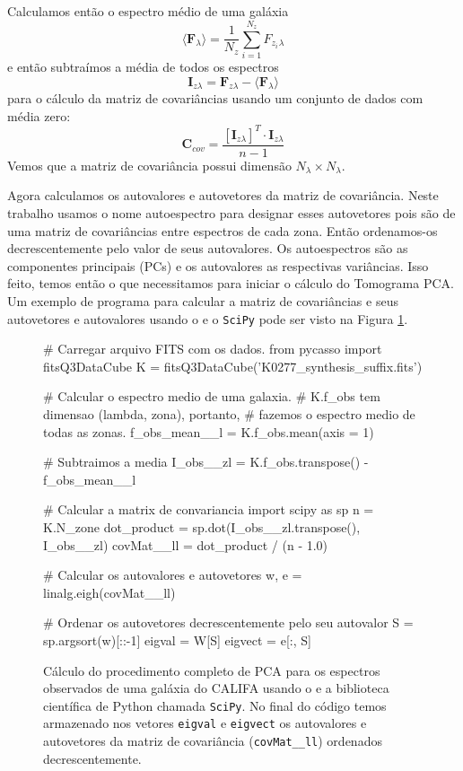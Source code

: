 Calculamos então o espectro médio de uma galáxia
\begin{equation}
\langle \textbf{F}{}_\lambda \rangle = \frac{1}{N_z} \sum_{i=1}^{N_z} F_{z_i}{}_{\lambda}
\end{equation}
\noindent e então subtraímos a média de todos os espectros
\begin{equation}
	\label{eq:PCA:Izl}
	\textbf{I}{}_{z \lambda} = \textbf{F}{}_{z \lambda} - \langle \textbf{F}{}_\lambda \rangle
\end{equation}
\noindent para o cálculo da matriz de covariâncias usando um conjunto de dados com média zero:
\begin{equation}
	\label{eq:PCA:covMatrix}
	\mathbf{C}{}_{cov} = \frac{[\mathbf{I}{}_{z \lambda}]^T \cdot \mathbf{I}{}_{z \lambda}}{n - 1}
\end{equation}
\noindent Vemos que a matriz de covariância possui dimensão $N_\lambda \times N_\lambda$.

Agora calculamos os autovalores e autovetores da matriz de covariância. Neste trabalho usamos o nome autoespectro para
designar esses autovetores pois são de uma matriz de covariâncias entre espectros de cada zona. Então ordenamos-os
decrescentemente pelo valor de seus autovalores. Os autoespectros são as componentes principais (PCs) e os autovalores
as respectivas variâncias. Isso feito, temos então o que necessitamos para iniciar o cálculo do Tomograma PCA. Um
exemplo de programa para calcular a matriz de covariâncias e seus autovetores e autovalores usando o \pycasso e o
\texttt{SciPy} pode ser visto na Figura \ref{fig:programaCovMatrix}.

\begin{figure}
	\begin{python}
# Carregar arquivo FITS com os dados.
from pycasso import fitsQ3DataCube
K = fitsQ3DataCube('K0277_synthesis_suffix.fits')

# Calcular o espectro medio de uma galaxia. 
# K.f_obs tem dimensao (lambda, zona), portanto, 
# fazemos o espectro medio de todas as zonas.
f_obs_mean__l = K.f_obs.mean(axis = 1)

# Subtraimos a media
I_obs__zl = K.f_obs.transpose() - f_obs_mean__l

# Calcular a matrix de convariancia
import scipy as sp
n = K.N_zone
dot_product = sp.dot(I_obs__zl.transpose(), I_obs__zl)
covMat__ll = dot_product / (n - 1.0)   

# Calcular os autovalores e autovetores
w, e = linalg.eigh(covMat__ll)

# Ordenar os autovetores decrescentemente pelo seu autovalor
S = sp.argsort(w)[::-1]
eigval = W[S]
eigvect = e[:, S]
	\end{python}
	\caption[Exemplo de cálculo de PCA usando o \pycasso e SciPy.] 
	{Cálculo do procedimento completo de PCA para os espectros observados de uma galáxia do CALIFA usando o \pycasso e a
	biblioteca científica de Python chamada \texttt{SciPy}. No final do código temos armazenado nos vetores \texttt{eigval}
	e \texttt{eigvect} os autovalores e autovetores da matriz de covariância (\texttt{covMat\_\_ll}) ordenados
	decrescentemente.}
	\label{fig:programaCovMatrix}
\end{figure}

